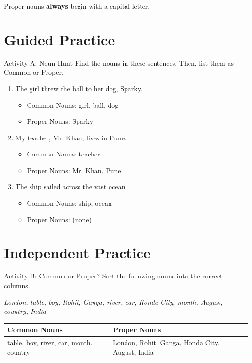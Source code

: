 \begin{rememberbox}
    Proper nouns \textbf{always} begin with a capital letter.
\end{rememberbox}

\section{Guided Practice}
\begin{activitybox}{Activity A: Noun Hunt}
Find the nouns in these sentences. Then, list them as Common or Proper.
\begin{enumerate}
    \item The \underline{girl} threw the \underline{ball} to her \underline{dog}, \underline{Sparky}.
    \begin{itemize}
        \item Common Nouns: girl, ball, dog
        \item Proper Nouns: Sparky
    \end{itemize}
    \item My teacher, \underline{Mr. Khan}, lives in \underline{Pune}.
    \begin{itemize}
        \item Common Nouns: teacher
        \item Proper Nouns: Mr. Khan, Pune
    \end{itemize}
    \item The \underline{ship} sailed across the vast \underline{ocean}.
    \begin{itemize}
        \item Common Nouns: ship, ocean
        \item Proper Nouns: (none)
    \end{itemize}
\end{enumerate}
\end{activitybox}

\section{Independent Practice}
\begin{activitybox}{Activity B: Common or Proper?}
Sort the following nouns into the correct columns.

\textit{London, table, boy, Rohit, Ganga, river, car, Honda City, month, August, country, India}

\begin{tabular}{|l|l|}
\hline
\textbf{Common Nouns} & \textbf{Proper Nouns} \\
\hline
table, boy, river, car, month, country & London, Rohit, Ganga, Honda City, August, India \\
\hline
\end{tabular}
\end{activitybox}

